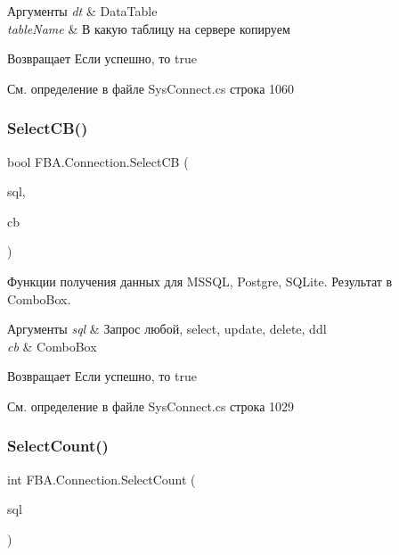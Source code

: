 \begin{DoxyParams}{Аргументы}
{\em dt} & Data\+Table\\
\hline
{\em table\+Name} & В какую таблицу на сервере копируем\\
\hline
\end{DoxyParams}
\begin{DoxyReturn}{Возвращает}
Если успешно, то true
\end{DoxyReturn}


См. определение в файле Sys\+Connect.\+cs строка 1060

\mbox{\label{class_f_b_a_1_1_connection_ab06c1ddb28525efd92457b44392378c4}} 
\subsubsection{\texorpdfstring{Select\+C\+B()}{SelectCB()}}
{\footnotesize\ttfamily bool F\+B\+A.\+Connection.\+Select\+CB (\begin{DoxyParamCaption}\item[{string}]{sql,  }\item[{Combo\+Box}]{cb }\end{DoxyParamCaption})}



Функции получения данных для M\+S\+S\+QL, Postgre, S\+Q\+Lite. Результат в Combo\+Box. 


\begin{DoxyParams}{Аргументы}
{\em sql} & Запрос любой, select, update, delete, ddl\\
\hline
{\em cb} & Combo\+Box\\
\hline
\end{DoxyParams}
\begin{DoxyReturn}{Возвращает}
Если успешно, то true
\end{DoxyReturn}


См. определение в файле Sys\+Connect.\+cs строка 1029

\mbox{\label{class_f_b_a_1_1_connection_a832beb0a31c62baefdb724e94537e97c}} 
\subsubsection{\texorpdfstring{Select\+Count()}{SelectCount()}}
{\footnotesize\ttfamily int F\+B\+A.\+Connection.\+Select\+Count (\begin{DoxyParamCaption}\item[{string}]{sql }\end{DoxyParamCaption})}



